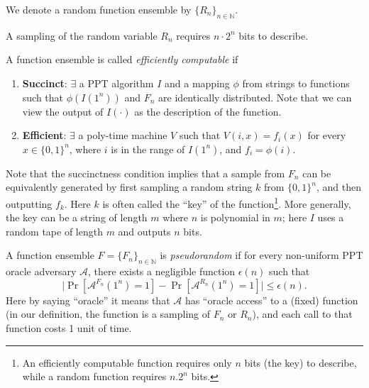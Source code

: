 \documentclass[12pt]{tufte-book}
\newcommand{\ma}{\mathcal{A}}
\begin{document}
\begin{definition}
    We denote a random function ensemble by $\{R_n\}_{n \in \mathbb{N}}$.
\end{definition}
A sampling of the random variable $R_n$ requires $n \cdot 2^n$ bits to describe.

\begin{definition}
    A function ensemble is called \emph{efficiently computable} if
    \begin{enumerate}[label=(\alph*)]
        \item \textbf{Succinct}:
              $\exists$ a PPT algorithm $I$ and a mapping $\phi$ from strings to functions such that
              $\phi(I(1^n))$ and $F_n$ are identically distributed.
              Note that we can view the output of $I(\cdot)$ as the description of the function.
        \item \textbf{Efficient}:
              $\exists$ a poly-time machine $V$ such that
              $V(i, x) = f_i(x)$ for every $x \in \{0, 1\}^n$, where $i$ is in the range of $I(1^n)$, and $f_i = \phi(i)$.
    \end{enumerate}
\end{definition}

Note that the succinctness condition implies that a sample from $F_n$ can be equivalently generated by first sampling a random string $k$ from $\{0, 1\}^n$, and then outputting $f_k$. Here $k$ is often called the ``key'' of the function\footnote{An efficiently computable function requires only $n$ bits (the key) to describe, while a random function requires $n.2^n$ bits.}. More generally, the key can be a string of length $m$ where $n$ is polynomial in $m$; here $I$ uses a random tape of length $m$ and outputs $n$ bits. 

\begin{definition}
    A function ensemble $F = \{F_n\}_{n \in \mathbb{N}}$ is \emph{pseudorandom} if
    for every non-uniform PPT oracle adversary $\ma$, there exists a negligible function $\epsilon(n)$ such that
    \[
        \big| \Pr[\ma^{F_n} (1^n) = 1] - \Pr[\ma^{R_n} (1^n) = 1]  \big| \leq \epsilon(n).
    \]
    Here by saying ``oracle'' it means that $\ma$ has ``oracle access'' to a (fixed) function (in our definition, the function is a sampling of $F_n$ or $R_n$), and each call to that function costs 1 unit of time.
\end{definition}
\end{document}

